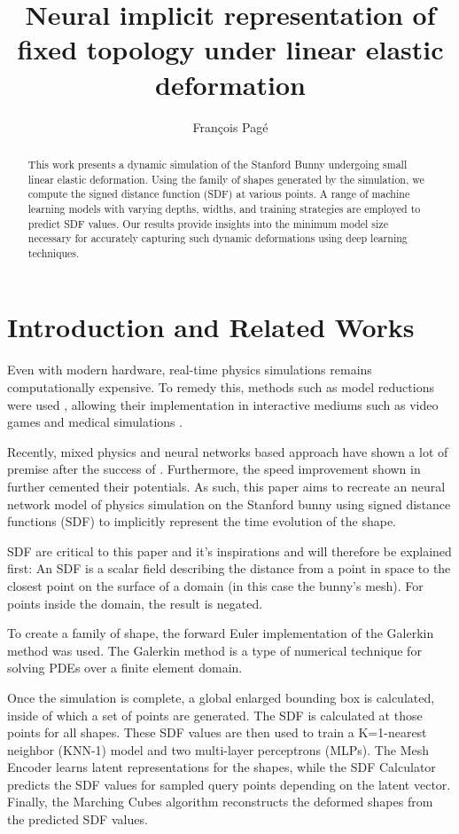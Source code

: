 \documentclass[a4paper,12pt]{article}
\title{Neural implicit representation of fixed topology under linear elastic deformation}
\author{François Pagé}
\date{}
\begin{document}
\maketitle
\begin{abstract}
	\centering
	This work presents a dynamic simulation of the Stanford Bunny undergoing small linear elastic deformation. Using the family of shapes generated by the simulation, we compute the signed distance function (SDF) at various points. A range of machine learning models with varying depths, widths, and training strategies are employed to predict SDF values. Our results provide insights into the minimum model size necessary for accurately capturing such dynamic deformations using deep learning techniques.
\end{abstract}

\newpage

\section*{Introduction and Related Works}
Even with modern hardware, real-time physics simulations remains computationally expensive. To remedy this, methods such as model reductions were used \cite{treuille2006model}, allowing their implementation in interactive mediums such as video games and medical simulations \cite{vanneste2020needle}.

Recently, mixed physics and neural networks based approach have shown a lot of premise after the success of \cite{deepsdf}. Furthermore, the speed improvement shown in \cite{neural_lod} further cemented their potentials. As such, this paper aims to recreate an neural network model of physics simulation on the Stanford bunny using signed distance functions (SDF) to implicitly represent the time evolution of the shape.

SDF are critical to this paper and it's inspirations and will therefore be explained first:
An SDF is a scalar field describing the distance from a point in space to the closest point on the surface of a domain (in this case the bunny's mesh). For points inside the domain, the result is negated.

To create a family of shape, the forward Euler implementation of the Galerkin method was used. The Galerkin method is a type of numerical technique for solving PDEs over a finite element domain.

Once the simulation is complete, a global enlarged bounding box is calculated, inside of which a set of points are generated. The SDF is calculated at those points for all shapes. These SDF values are then used to train a K=1-nearest neighbor (KNN-1) model and two multi-layer perceptrons (MLPs). The Mesh Encoder learns latent representations for the shapes, while the SDF Calculator predicts the SDF values for sampled query points depending on the latent vector. Finally, the Marching Cubes algorithm reconstructs the deformed shapes from the predicted SDF values.
\end{document}
